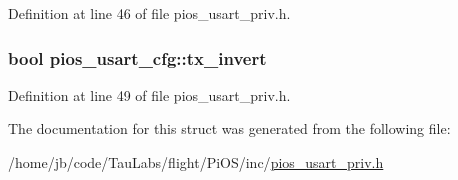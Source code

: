 \-Definition at line 46 of file pios\-\_\-usart\-\_\-priv.\-h.

\hypertarget{structpios__usart__cfg_afc7c29e0ea546f0e5ed89b0063a51198}{
\subsubsection[{tx\-\_\-invert}]{\setlength{\rightskip}{0pt plus 5cm}bool {\bf pios\-\_\-usart\-\_\-cfg\-::tx\-\_\-invert}}}\label{structpios__usart__cfg_afc7c29e0ea546f0e5ed89b0063a51198}


\-Definition at line 49 of file pios\-\_\-usart\-\_\-priv.\-h.



\-The documentation for this struct was generated from the following file\-:\begin{DoxyCompactItemize}
\item 
/home/jb/code/\-Tau\-Labs/flight/\-Pi\-O\-S/inc/\hyperlink{pios__usart__priv_8h}{pios\-\_\-usart\-\_\-priv.\-h}\end{DoxyCompactItemize}
